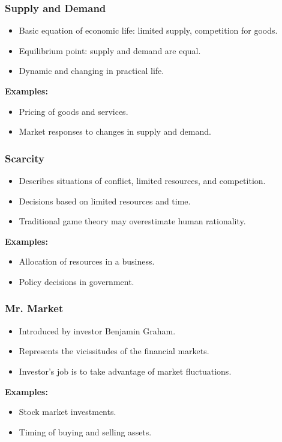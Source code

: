 \begin{frame}[fragile]\frametitle{Supply and Demand}
\begin{itemize}
    \item Basic equation of economic life: limited supply, competition for goods.
    \item Equilibrium point: supply and demand are equal.
    \item Dynamic and changing in practical life.
\end{itemize}
\textbf{Examples:}
\begin{itemize}
    \item Pricing of goods and services.
    \item Market responses to changes in supply and demand.
\end{itemize}
\end{frame}

\begin{frame}[fragile]\frametitle{Scarcity}
\begin{itemize}
    \item Describes situations of conflict, limited resources, and competition.
    \item Decisions based on limited resources and time.
    \item Traditional game theory may overestimate human rationality.
\end{itemize}
\textbf{Examples:}
\begin{itemize}
    \item Allocation of resources in a business.
    \item Policy decisions in government.
\end{itemize}
\end{frame}

\begin{frame}[fragile]\frametitle{Mr. Market}
\begin{itemize}
    \item Introduced by investor Benjamin Graham.
    \item Represents the vicissitudes of the financial markets.
    \item Investor's job is to take advantage of market fluctuations.
\end{itemize}
\textbf{Examples:}
\begin{itemize}
    \item Stock market investments.
    \item Timing of buying and selling assets.
\end{itemize}
\end{frame}

